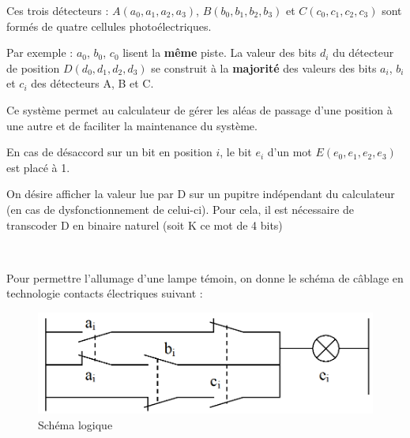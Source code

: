 Ces trois détecteurs : $A(a_0,a_1,a_2,a_3)$, $B(b_0,b_1,b_2,b_3)$ et $C(c_0,c_1,c_2,c_3)$ sont formés de quatre cellules photoélectriques.
						
Par exemple : $a_0$, $b_0$, $c_0$ lisent la \textbf{même} piste. La valeur des bits $d_i$ du détecteur de position $D(d_0,d_1,d_2,d_3)$ se construit à la \textbf{majorité} des valeurs des bits $a_i$, $b_i$ et $c_i$ des détecteurs A, B et C.
		
Ce système permet au calculateur de gérer les aléas de passage d'une position à une autre et de faciliter la maintenance du système.

En cas de désaccord sur un bit en position $i$, le bit $e_i$ d'un mot  $E(e_0,e_1,e_2,e_3)$ est placé à 1.




On désire afficher la valeur lue par D sur un pupitre indépendant du calculateur (en cas de dysfonctionnement de celui-ci). Pour cela, il est nécessaire de transcoder D en binaire naturel (soit K ce mot de 4 bits)



~\

Pour permettre l'allumage d'une lampe témoin, on donne le schéma de câblage en technologie \og contacts électriques \fg suivant :

\begin{figure}[!h]
\begin{center}
	\includegraphics[width=0.5\linewidth]{img/fig11}
\end{center}
\caption{Schéma logique}
\label{fig11}
\end{figure} 

